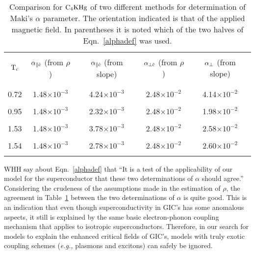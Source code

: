 \begin{table}
\begin{center}
\begin{tabular}{|c|cccc|}
\hline
& & & &  \\
$\rm T_c$  & $\rm \alpha_{\parallel \hat{c}}$ (from $\rho$) & $\rm \alpha_{\parallel \hat{c}}$ (from slope) & $\rm \alpha_{\perp \hat{c}}$ (from $\rho$)
& $\rm \alpha_{\perp}$ (from slope) \\
& & & &  \\
\hline
& & & &  \\
0.72\cite{iye82} & 1.48$\times 10^{-3}$ & 4.24$\times 10^{-3}$  & 2.48$\times 10^{-2}$ & 4.14$\times 10^{-2}$\\
& & & &  \\
0.95 & 1.48$\times 10^{-3}$ & 2.32$\times 10^{-3}$  & 2.48$\times 10^{-2}$ & 1.98$\times 10^{-2}$\\
& & & &  \\
1.53 & 1.48$\times 10^{-3}$ & 3.78$\times 10^{-3}$  & 2.48$\times 10^{-2}$ & 2.58$\times 10^{-2}$\\
& & & &  \\
1.54 & 1.48$\times 10^{-3}$ & 2.78$\times 10^{-3}$ & 2.48$\times 10^{-2}$ & 2.60$\times 10^{-2}$\\
& & & &  \\
\hline
\end{tabular}
\end{center}
\caption[Comparison for   $\rm
C_4KHg$  of  two  different  methods for  determination of Maki's  $\alpha$
parameter.]{Comparison for   $\rm  C_4KHg$  of   two different methods  for
determination    of   Maki's   $\alpha$  parameter.\cite{werthamer66}   The
orientation indicated is that of the applied magnetic field. In parentheses
it is noted which of the two halves of Eqn.~\ref{alphadef} was used.}
\label{alphatable}
\end{table}

        WHH  say  about Eqn.~\ref{alphadef}  that  ``It  is a  test of  the
applicability of   our model    for  the   superconductor  that  these  two
determinations  of $\alpha$ should agree.''\cite{werthamer66}   Considering
the crudeness  of  the  assumptions made  in the  estimation of $\rho$, the
agreement in  Table~\ref{alphatable}  between   the two  determinations  of
$\alpha$   is quite   good.   This  is an   indication that   even   though
superconductivity   in GIC's has  some  anomalous  aspects, it    still  is
explained by the same basic electron-phonon coupling mechanism that applies
to  isotropic  superconductors.  Therefore, in  our  search  for models  to
explain the enhanced  critical fields of GIC's,  models  with  truly exotic
coupling  schemes  ({\em  e.g.,\/} plasmons  and  excitons) can   safely be
ignored.

